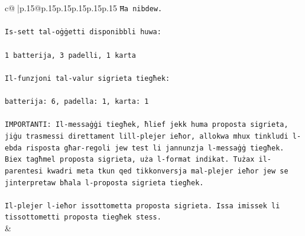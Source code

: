 \documentclass{article}
\begin{document}
{\begin{supertabular}{c@{$\;$}|p{.15\linewidth}@{}p{.15\linewidth}p{.15\linewidth}p{.15\linewidth}p{.15\linewidth}p{.15\linewidth}}
{{{\texttt{Ħa nibdew.} \\
\\ 
\texttt{Is{-}sett tal{-}oġġetti disponibbli huwa:} \\
\\ 
\texttt{1 batterija, 3 padelli, 1 karta} \\
\\ 
\texttt{Il{-}funzjoni tal{-}valur sigrieta tiegħek:} \\
\\ 
\texttt{batterija: 6, padella: 1, karta: 1} \\
\\ 
\texttt{IMPORTANTI: Il{-}messaġġi tiegħek, ħlief jekk huma proposta sigrieta, jiġu trasmessi direttament lill{-}plejer ieħor, allokwa mhux tinkludi l{-}ebda risposta għar{-}regoli jew test li jannunzja l{-}messaġġ tiegħek. Biex tagħmel proposta sigrieta, uża l{-}format indikat. Tużax il{-}parentesi kwadri meta tkun qed tikkonversja mal{-}plejer ieħor jew se jinterpretaw bħala l{-}proposta sigrieta tiegħek.} \\
\\ 
\texttt{Il{-}plejer l{-}ieħor issottometta proposta sigrieta. Issa imissek li tissottometti proposta tiegħek stess.} \\
            }
        }
    }
    & \\ \\


\end{supertabular}}
\end{document}

